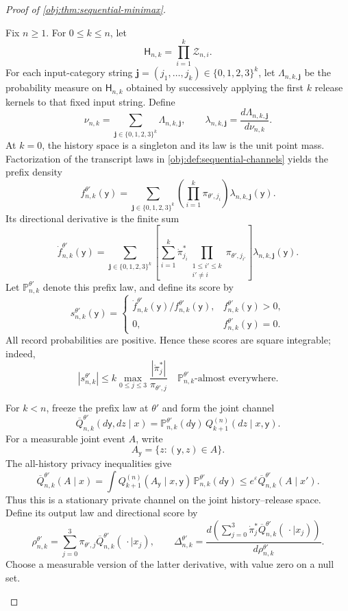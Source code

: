 \documentclass[11pt]{article}
\begin{document}
\begin{proof}[Proof of \cref{obj:thm:sequential-minimax}]
\begin{enumerate}
Fix \(n\ge1\). For \(0\le k\le n\), let
\[
\mathsf H_{n,k}=\prod_{i=1}^{k}\mathcal Z_{n,i}.
\]
For each input-category string
\(\mathbf j=(j_1,\ldots,j_k)\in\{0,1,2,3\}^k\), let
\(\Lambda_{n,k,\mathbf j}\) be the probability measure on \(\mathsf H_{n,k}\) obtained by successively applying the first \(k\) release kernels to that fixed input string. Define
\[
\nu_{n,k}
=
\sum_{\mathbf j\in\{0,1,2,3\}^k}\Lambda_{n,k,\mathbf j},
\qquad
\lambda_{n,k,\mathbf j}
=
\frac{d\Lambda_{n,k,\mathbf j}}{d\nu_{n,k}}.
\]
At \(k=0\), the history space is a singleton and its law is the unit point mass. Factorization of the transcript laws in \cref{obj:def:sequential-channels} yields the prefix density
\[
f_{n,k}^{\theta'}(\mathsf y)
=
\sum_{\mathbf j\in\{0,1,2,3\}^k}
\left(\prod_{i=1}^{k}\pi_{\theta',j_i}\right)
\lambda_{n,k,\mathbf j}(\mathsf y).
\]
Its directional derivative is the finite sum
\[
\dot f_{n,k}^{\theta'}(\mathsf y)
=
\sum_{\mathbf j\in\{0,1,2,3\}^k}
\left[
\sum_{i=1}^{k}
\dot\pi_{j_i}^*
\prod_{\substack{1\le i'\le k\\i'\ne i}}
\pi_{\theta',j_{i'}}
\right]
\lambda_{n,k,\mathbf j}(\mathsf y).
\]
Let \(\mathbb P_{n,k}^{\theta'}\) denote this prefix law, and define its score by
\[
s_{n,k}^{\theta'}(\mathsf y)
=
\begin{cases}
\dot f_{n,k}^{\theta'}(\mathsf y)/f_{n,k}^{\theta'}(\mathsf y),
&f_{n,k}^{\theta'}(\mathsf y)>0,\\
0,&f_{n,k}^{\theta'}(\mathsf y)=0.
\end{cases}
\]
All record probabilities are positive. Hence these scores are square integrable; indeed,
\[
|s_{n,k}^{\theta'}|
\le
k\max_{0\le j\le3}
\frac{|\dot\pi_j^*|}{\pi_{\theta',j}}
\quad
\mathbb P_{n,k}^{\theta'}\text{-almost everywhere}.
\]

For \(k<n\), freeze the prefix law at \(\theta'\) and form the joint channel
\[
\overline Q_{n,k}^{\theta'}(d\mathsf y,dz\mid x)
=
\mathbb P_{n,k}^{\theta'}(d\mathsf y)\,
Q_{k+1}^{(n)}(dz\mid x,\mathsf y).
\]
For a measurable joint event \(A\), write
\[
A_{\mathsf y}=\{z:(\mathsf y,z)\in A\}.
\]
The all-history privacy inequalities give
\[
\overline Q_{n,k}^{\theta'}(A\mid x)
=
\int Q_{k+1}^{(n)}(A_{\mathsf y}\mid x,\mathsf y)
\,\mathbb P_{n,k}^{\theta'}(d\mathsf y)
\le
e^\varepsilon\overline Q_{n,k}^{\theta'}(A\mid x').
\]
Thus this is a stationary private channel on the joint history--release space. Define its output law and directional score by
\[
\rho_{n,k}^{\theta'}
=
\sum_{j=0}^3
\pi_{\theta',j}\overline Q_{n,k}^{\theta'}(\,\cdot\mid x_j),
\qquad
\Delta_{n,k}^{\theta'}
=
\frac{d\left(\sum_{j=0}^3
\dot\pi_j^*\overline Q_{n,k}^{\theta'}(\,\cdot\mid x_j)\right)}
{d\rho_{n,k}^{\theta'}}.
\]
Choose a measurable version of the latter derivative, with value zero on a null set.


\end{enumerate}
\end{proof}
\end{document}
